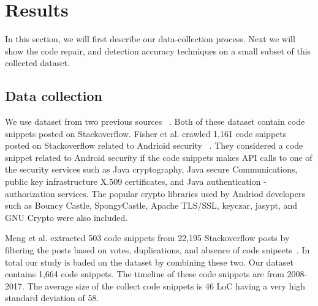 \section{Results}
\label{sec:results}
In this section, we will first describe our data-collection process. Next we will show the code repair, and detection accuracy techniques on a small subset of this collected dataset.   

\subsection{Data collection} 
  We use dataset from two previous sources ~\cite{meng2018secure,fischer2017stack}. Both of these dataset contain code snippets posted on Stackoverflow. 
  Fisher et al. crawled 1,161 code snippets posted on Stackoverflow related to Andrioid security ~\cite{fischer2017stack}. They considered a code snippet related to Android security if the code snippets makes API calls to
  one of the security services such as Java cryptography, Java secure Communications, public key infrastructure X.509 certificates, and Java authentication - authorization services. The popular crypto libraries used by Andriod developers such as Bouncy Castle, SpongyCastle, Apache TLS/SSL, keyczar, jasypt, and GNU Crypto were also included. 
  
  Meng et al.  extracted 503 code snippets from 22,195 Stackoverflow posts by filtering the posts based on votes, duplications, and absence of code snipeets~\cite{meng2018secure}. In total our study is baded on the dataset by combining these two. Our dataset contains 1,664 code snippets. The timeline of these code snippets are from 2008-2017.
  The average size of the collect code snippets is 46 LoC having a very high standard deviation of 58.


  

